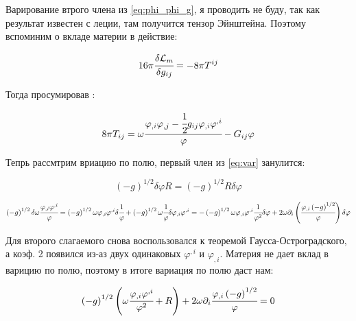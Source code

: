 \documentclass[a4paper]{article}
\newcommand{\inner}[1]{\left( #1 \right)}
\renewcommand{\phi}{\varphi}
\numberwithin{equation}{section}
\begin{document}
Варирование втрого члена из \ref{eq:phi_phi_g}, я проводить не буду, так как результат известен с леции, 
там получится тензор Эйнштейна. Поэтому вспоминим о вкладе материи в действие:

\begin{equation}
    16 \pi \cfrac{\delta \mathcal{L}_m}{\delta g_{ij}} = -8\pi T^{ij}
\end{equation}

Тогда просумировав :

\begin{equation}
    8\pi T_{ij} = \omega \cfrac{\phi_{,i}\phi_{,j} 
    - \cfrac{1}{2}g_{ij}\phi_{,i}\phi^{,i}}{\phi} - G_{ij}\phi
\end{equation}

Тепрь рассмтрим вриацию по полю, первый член из \ref{eq:var} занулится:

\begin{equation}
    \inner{-g}^{1/2} \delta \phi R  = \inner{-g}^{1/2} R \delta \phi
\end{equation}

\begin{equation}
    \inner{-g}^{1/2} \delta\omega \cfrac{\phi_{,i}\phi^{,i}}{\phi} =
    \inner{-g}^{1/2} \omega \phi_{,i}\phi^{,i} \delta \cfrac{1}{\phi} 
    + \inner{-g}^{1/2} \omega \cfrac{1}{\phi}  \delta \phi_{,i}\phi^{,i} 
    = -\inner{-g}^{1/2} \omega \phi_{,i}\phi^{,i} \cfrac{1}{\phi^2} \delta \phi 
    + 2  \omega \partial_i \inner{\cfrac{\phi_{,i}\inner{-g}^{1/2}}{\phi}} \delta \phi
\end{equation}

Для второго слагаемого снова воспользовался к теоремой Гаусса-Остроградского, а коэф.
2 появился из-аз двух одинаковых $\phi^{,i}$ и $\phi_{,i}$. Материя не дает вклад в 
варицию по полю, поэтому в итоге вариация по полю даст нам:

\begin{equation}
    \inner{-g}^{1/2} \inner{\omega \cfrac{\phi_{,i}\phi^{,i}}{\phi^2} + R} 
    + 2  \omega \partial_i \cfrac{\phi_{,i}\inner{-g}^{1/2}}{\phi} = 0
\end{equation}
\end{document}
